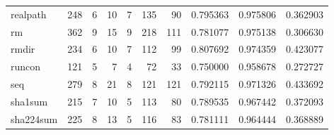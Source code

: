 \begin{longtable}{lrrrrrrrrr}
realpath  &                    248 &                                  6 &                                10 &                                7 &                               135 &                              90 &                                0.795363 &                               0.975806 &                             0.362903 \\
rm        &                    362 &                                  9 &                                15 &                                9 &                               218 &                             111 &                                0.781077 &                               0.975138 &                             0.306630 \\
rmdir     &                    234 &                                  6 &                                10 &                                7 &                               112 &                              99 &                                0.807692 &                               0.974359 &                             0.423077 \\
runcon    &                    121 &                                  5 &                                 7 &                                4 &                                72 &                              33 &                                0.750000 &                               0.958678 &                             0.272727 \\
seq       &                    279 &                                  8 &                                21 &                                8 &                               121 &                             121 &                                0.792115 &                               0.971326 &                             0.433692 \\
sha1sum   &                    215 &                                  7 &                                10 &                                5 &                               113 &                              80 &                                0.789535 &                               0.967442 &                             0.372093 \\
sha224sum &                    225 &                                  8 &                                13 &                                5 &                               116 &                              83 &                                0.781111 &                               0.964444 &                             0.368889 \\

\end{longtable}
